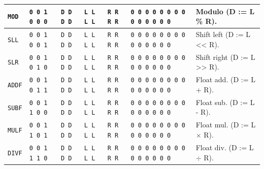 \documentclass{report}
\begin{document}
{\begin{center}
\begin{tabular}[ht]{
	| p{} | p{} | p{} | p{}
	| p{} | p{} | p{} |
}
	\texttt{MOD} & \texttt{0 0 1 0 0 0} & \texttt{D D D D} & \texttt{L L L L} & \texttt{R R R R} &
		\texttt{0 0 0 0 0 0 0 0 0 0 0 0 0 0} & Modulo (D := L \% R). \\
	\hline
	
	\texttt{SLL} & \texttt{0 0 1 0 0 1} & \texttt{D D D D} & \texttt{L L L L} & \texttt{R R R R} &
		\texttt{0 0 0 0 0 0 0 0 0 0 0 0 0 0} & Shift left (D := L << R). \\
	\hline
	
	\texttt{SLR} & \texttt{0 0 1 0 1 0} & \texttt{D D D D} & \texttt{L L L L} & \texttt{R R R R} &
		\texttt{0 0 0 0 0 0 0 0 0 0 0 0 0 0} & Shift right (D := L >> R). \\
	\hline
	
	\texttt{ADDF} & \texttt{0 0 1 0 1 1} & \texttt{D D D D} & \texttt{L L L L} & \texttt{R R R R} &
		\texttt{0 0 0 0 0 0 0 0 0 0 0 0 0 0} & Float add. (D := L + R). \\
	\hline
	
	\texttt{SUBF} & \texttt{0 0 1 1 0 0} & \texttt{D D D D} & \texttt{L L L L} & \texttt{R R R R} &
		\texttt{0 0 0 0 0 0 0 0 0 0 0 0 0 0} & Float sub. (D := L - R). \\
	\hline
	
	\texttt{MULF} & \texttt{0 0 1 1 0 1} & \texttt{D D D D} & \texttt{L L L L} & \texttt{R R R R} &
		\texttt{0 0 0 0 0 0 0 0 0 0 0 0 0 0} & Float mul. (D := L $\times$ R). \\
	\hline
	
	\texttt{DIVF} & \texttt{0 0 1 1 1 0} & \texttt{D D D D} & \texttt{L L L L} & \texttt{R R R R} &
		\texttt{0 0 0 0 0 0 0 0 0 0 0 0 0 0} & Float div. (D := L $\div$ R). \\
	\hline
\end{tabular}
\end{center}
}
\end{document}
